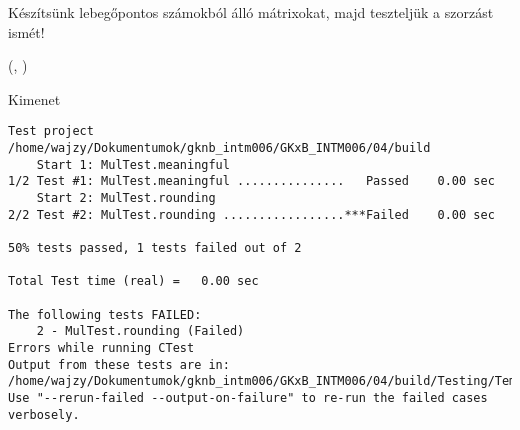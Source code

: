 \begin{frame}
  Készítsünk lebegőpontos számokból álló mátrixokat, majd teszteljük a szorzást ismét!
  \begin{exampleblock}{ %
    (, %
     )}
    \small
    
  \end{exampleblock}
\end{frame}

\begin{frame}
  \begin{exampleblock}{}
    \small
    
  \end{exampleblock}
\end{frame}

\begin{frame}[fragile]
  \begin{block}{Kimenet}
    \tiny
    \vspace{-.5cm}
    \begin{verbatim}
Test project /home/wajzy/Dokumentumok/gknb_intm006/GKxB_INTM006/04/build
    Start 1: MulTest.meaningful
1/2 Test #1: MulTest.meaningful ...............   Passed    0.00 sec
    Start 2: MulTest.rounding
2/2 Test #2: MulTest.rounding .................***Failed    0.00 sec

50% tests passed, 1 tests failed out of 2

Total Test time (real) =   0.00 sec

The following tests FAILED:
    2 - MulTest.rounding (Failed)
Errors while running CTest
Output from these tests are in: /home/wajzy/Dokumentumok/gknb_intm006/GKxB_INTM006/04/build/Testing/Temporary/LastTest.log
Use "--rerun-failed --output-on-failure" to re-run the failed cases verbosely.
\end{verbatim}
    \vspace{-.4cm}
  \end{block}
\end{frame}


